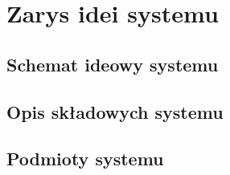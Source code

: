 % 
\newpage\section{Zarys idei systemu \NazwaSys}\label{sec:ideasystemu}
\subsection{Schemat ideowy systemu \NazwaSys}
\subsection{Opis składowych systemu}
\subsection{Podmioty systemu} 